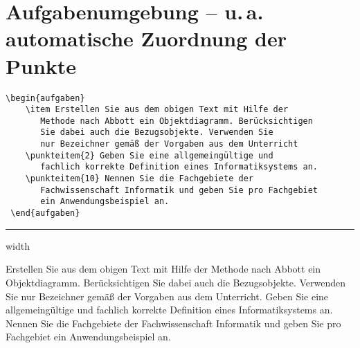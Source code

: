 \documentclass[a4paper]{scrartcl}
\begin{document}
 \section*{Aufgabenumgebung -- u.\,a. automatische Zuordnung der Punkte}
 \begin{lstlisting}[gobble=1,caption={}]
 \begin{aufgaben}
    \item Erstellen Sie aus dem obigen Text mit Hilfe der
       Methode nach Abbott ein Objektdiagramm. Berücksichtigen 
       Sie dabei auch die Bezugsobjekte. Verwenden Sie  
       nur Bezeichner gemäß der Vorgaben aus dem Unterricht
    \punkteitem{2} Geben Sie eine allgemeingültige und
       fachlich korrekte Definition eines Informatiksystems an.
    \punkteitem{10} Nennen Sie die Fachgebiete der 
       Fachwissenschaft Informatik und geben Sie pro Fachgebiet 
       ein Anwendungsbeispiel an.
 \end{aufgaben}
 \end{lstlisting}

 \vspace{0.6cm}
 \hrule width \textwidth
 \vspace{1cm}

 \begin{aufgaben}
    \item Erstellen Sie aus dem obigen Text mit Hilfe der Methode 
       nach Abbott ein Objektdiagramm. Berücksichtigen Sie dabei 
       auch die Bezugsobjekte. Verwenden Sie  nur Bezeichner 
       gemäß der Vorgaben aus dem Unterricht.
     Geben Sie eine allgemeingültige und fachlich 
       korrekte Definition eines Informatiksystems	an.
     Nennen Sie die Fachgebiete der Fachwissenschaft 
       Informatik und geben Sie pro Fachgebiet ein Anwendungsbeispiel 
       an.
 \end{aufgaben}
\end{document}
